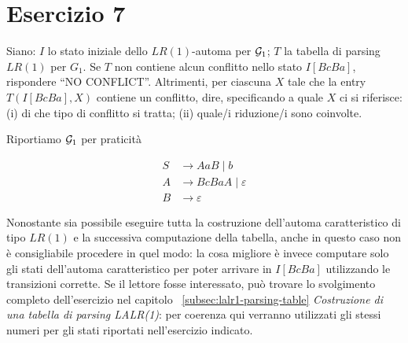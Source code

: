 \documentclass[class=book, crop=false, oneside, 12pt]{standalone}
\begin{document}
\section*{Esercizio 7}

Siano: \(I\) lo stato iniziale dello \(LR(1)\)-automa per \(\mathcal{G}_1\); \(T\) la tabella di parsing \(LR(1)\) per \(G_1\).  Se \(T\) non contiene alcun conflitto nello stato \(I[BcBa]\), rispondere “NO CONFLICT”.  Altrimenti, per ciascuna \(X\) tale che la entry \(T(I[BcBa],X)\) contiene un conflitto, dire, specificando a quale \(X\) ci si riferisce:  (i) di che tipo di conflitto si tratta; (ii) quale/i riduzione/i sono coinvolte.

Riportiamo \(\mathcal{G}_1\) per praticità

\begin{align*}
    S &\to AaB \mid b \\
    A &\to BcBaA \mid \varepsilon \\
    B &\to \varepsilon
\end{align*}

Nonostante sia possibile eseguire tutta la costruzione dell'automa caratteristico di tipo \(LR(1)\) e la successiva computazione della tabella, anche in questo caso non è consigliabile procedere in quel modo: la cosa migliore è invece computare solo gli stati dell'automa caratteristico per poter arrivare in \(I[BcBa]\) utilizzando le transizioni corrette. Se il lettore fosse interessato, può trovare lo svolgimento completo dell'esercizio nel capitolo ~\ref{subsec:lalr1-parsing-table} \emph{Costruzione di una tabella di parsing LALR(1)}: per coerenza qui verranno utilizzati gli stessi numeri per gli stati riportati nell'esercizio indicato. 
\end{document}

